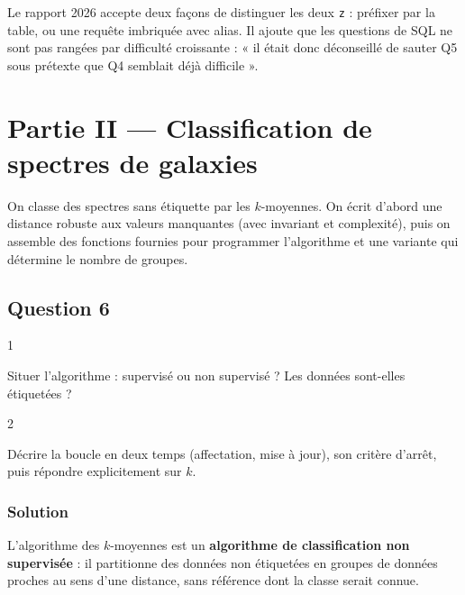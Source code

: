 \documentclass[11pt,a4paper]{article}
\begin{document}
\begin{jury}

Le rapport 2026 accepte deux façons de distinguer les deux \texttt{z} : préfixer par la table, ou une requête imbriquée avec alias. Il ajoute que les questions de SQL ne sont pas rangées par difficulté croissante : « il était donc déconseillé de sauter Q5 sous prétexte que Q4 semblait déjà difficile ».

\end{jury}

\hypertarget{partie-ii-classification-de-spectres-de-galaxies}{%
\section{Partie II --- Classification de spectres de galaxies}\label{partie-ii-classification-de-spectres-de-galaxies}}

On classe des spectres sans étiquette par les \(k\)-moyennes. On écrit d'abord une distance robuste aux valeurs manquantes (avec invariant et complexité), puis on assemble des fonctions fournies pour programmer l'algorithme et une variante qui détermine le nombre de groupes.

\hypertarget{question-6}{%
\subsection{Question 6}\label{question-6}}

\begin{indication}{1}

Situer l'algorithme : supervisé ou non supervisé ? Les données sont-elles étiquetées ?

\end{indication}

\begin{indication}{2}

Décrire la boucle en deux temps (affectation, mise à jour), son critère d'arrêt, puis répondre explicitement sur \(k\).

\end{indication}

\hypertarget{solution-5}{%
\subsubsection{Solution}\label{solution-5}}

L'algorithme des \(k\)-moyennes est un \textbf{algorithme de classification non supervisée} : il partitionne des données non étiquetées en groupes de données proches au sens d'une distance, sans référence dont la classe serait connue.
\end{document}
